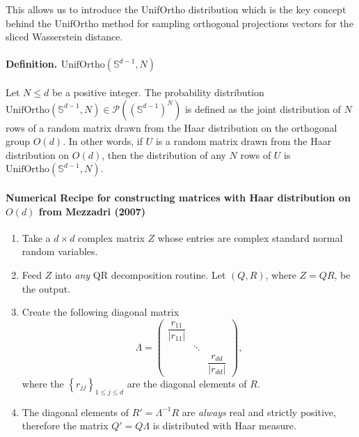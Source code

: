 \documentclass[12pt,a4paper]{report}
\begin{document}
This allows us to introduce the UnifOrtho distribution which is the key concept behind the UnifOrtho method for sampling orthogonal projections vectors for the sliced Wasserstein distance.

\paragraph{Definition. $\text{UnifOrtho}(\mathbb{S}^{d-1}, N)$}
Let $N \le d$ be a positive integer. The probability distribution $\text{UnifOrtho}(\mathbb{S}^{d-1}, N) \in \mathcal{P}((\mathbb{S}^{d-1})^N)$ is defined as the joint distribution of $N$ rows of a random matrix drawn from the Haar distribution on the orthogonal group $O(d)$. In other words, if $U$ is a random matrix drawn from the Haar distribution on $O(d)$, then the distribution of any $N$ rows of $U$ is $\text{UnifOrtho}(\mathbb{S}^{d-1},N)$. \cite{RowlandEtAl2019}

\paragraph{Numerical Recipe for constructing matrices with Haar distribution on $O(d)$ from Mezzadri (2007) \cite{Mezzadri2007}}
\begin{enumerate}
    \item Take a $d \times d$ complex matrix $Z$ whose entries are complex standard 
          normal random variables.
    
    \item Feed $Z$ into \textit{any} QR decomposition routine. Let $(Q, R)$, where 
          $Z = QR$, be the output.
    
    \item Create the following diagonal matrix
    \begin{equation}
        \Lambda = 
        \begin{pmatrix}
            \dfrac{r_{11}}{|r_{11}|} & & \\[6pt]
            & \ddots & \\[6pt]
            & & \dfrac{r_{dd}}{|r_{dd}|}
        \end{pmatrix},
        \label{eq:5.12}
    \end{equation}
    where the $\left\{r_{jj}\right\}_{1 \le j \le d}$ are the diagonal elements of $R$.
    
    \item The diagonal elements of $R' = \Lambda^{-1}R$ are \textit{always} real and 
          strictly positive, therefore the matrix $Q' = Q\Lambda$ is distributed 
          with Haar measure.
\end{enumerate}
\end{document}
